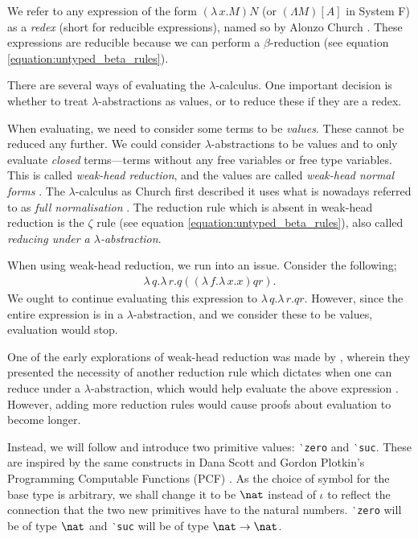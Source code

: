 We refer to any expression of the form $(\lambda \, x. M) N$ (or $(\Lambda M) [A]$ in System F) as a
\textit{redex} (short for reducible expressions), named so by Alonzo Church
\citep[p.~56]{pierce_types_2002}. These expressions are reducible because we can perform a
$\beta$-reduction (see equation \ref{equation:untyped_beta_rules}).

There are several ways of evaluating the $\lambda$-calculus. One important decision is whether to
treat $\lambda$-abstractions as values, or to reduce these if they are a redex.

When evaluating, we need to consider some terms to be \textit{values}. These cannot be reduced any
further. We could consider $\lambda$-abstractions to be values and to only evaluate \textit{closed}
terms---terms without any free variables or free type variables. This is called \textit{weak-head
reduction}, and the values are called \textit{weak-head normal forms}
\citep{wadler_programming_2022}. The $\lambda$-calculus as Church first described it uses what is
nowadays referred to as \textit{full normalisation} \citep{wadler_programming_2022}. The reduction
rule which is absent in weak-head reduction is the $\zeta$ rule (see equation
\ref{equation:untyped_beta_rules}), also called \textit{reducing under a $\lambda$-abstraction}.

When using weak-head reduction, we run into an issue. Consider the following;
\begin{align*}
  \lambda \, q. \lambda \, r. q ((\lambda \, f. \lambda \, x . x) q r).
\end{align*}
We ought to continue evaluating this expression to $\lambda \, q. \lambda \, r. q r$. However, since
the entire expression is in a $\lambda$-abstraction, and we consider these to be values, evaluation
would stop.

One of the early explorations of weak-head reduction was made by \citet{cagman_combinatory_1998},
wherein they presented the necessity of another reduction rule which dictates when one can reduce
under a $\lambda$-abstraction, which would help evaluate the above expression
\citep{hutchison_sharing_2005}. However, adding more reduction rules would cause proofs about
evaluation to become longer.

Instead, we will follow \citet{wadler_programming_2022} and introduce two primitive values:
\texttt{‵zero} and \texttt{‵suc}. These are inspired by the same constructs in Dana Scott and Gordon
Plotkin's Programming Computable Functions (PCF) \citep{plotkin_lcf_1977}. As the choice of symbol
for the base type is arbitrary, we shall change it to be $\nat$ instead of $\iota$ to reflect the
connection that the two new primitives have to the natural numbers. \texttt{‵zero} will be of type
$\nat$ and \texttt{‵suc} will be of type $\nat \to \nat$.

